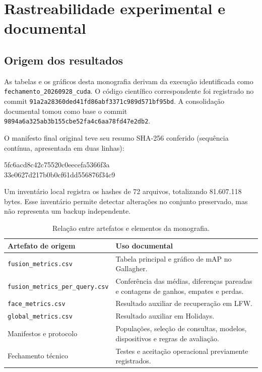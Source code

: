 \chapter{Rastreabilidade experimental e documental}
\label{ap:rastreabilidade}
\label{ap:reproducao}
\section{Origem dos resultados}
As tabelas e os gráficos desta monografia derivam da execução identificada como \texttt{fechamento\_20260928\_cuda}. O código científico correspondente foi registrado no commit \texttt{91a2a28360ded41fd86abf3371c989d571bf95bd}. A consolidação documental tomou como base o commit \texttt{9894a6a325ab3b155cbe52fa4c6aa78fd47e2db2}.

O manifesto final original teve seu resumo SHA-256 conferido (sequência contínua, apresentada em duas linhas):
\begin{center}\small\ttfamily
5fc6acd8c42c75520c0eecefa5366f3a\\
33e0627d217b0b0cf61dd556876f34c9
\end{center} Um inventário local registra os hashes de 72 arquivos, totalizando 81.607.118 bytes. Esse inventário permite detectar alterações no conjunto preservado, mas não representa um backup independente.

\begin{table}[htbp]
\centering\caption{Relação entre artefatos e elementos da monografia.}
\begin{tabularx}{\textwidth}{>{\raggedright\arraybackslash}p{}>{\raggedright\arraybackslash}X}\toprule
Artefato de origem & Uso documental\\\midrule
\texttt{fusion\_metrics.csv} & Tabela principal e gráfico de mAP no Gallagher.\\
\texttt{fusion\_metrics\_}\allowbreak\texttt{per\_query.csv} & Conferência das médias, diferenças pareadas e contagens de ganhos, empates e perdas.\\
\texttt{face\_metrics.csv} & Resultado auxiliar de recuperação em LFW.\\
\texttt{global\_metrics.csv} & Resultado auxiliar em Holidays.\\
Manifestos e protocolo & Populações, seleção de consultas, modelos, dispositivos e regras de avaliação.\\
Fechamento técnico & Testes e aceitação operacional previamente registrados.\\\bottomrule
\end{tabularx}
\end{table}

